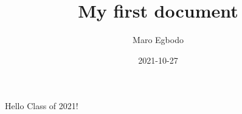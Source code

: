 \documentclass{article}
\title{My first document}
\date{2021-10-27}
\author{Maro Egbodo}
\begin{document}
	\maketitle
	\newpage
	Hello Class of 2021!
\end{document}
